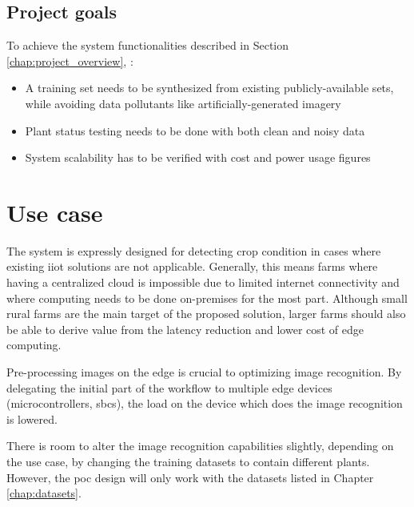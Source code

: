 \documentclass{report}
\begin{document}
	\section{Project goals}
	To achieve the system functionalities described in Section \ref{chap:project_overview}, :
	\begin{itemize}
		\item A training set needs to be synthesized from existing publicly-available sets, while avoiding data pollutants like artificially-generated imagery
		\item Plant status testing needs to be done with both clean and noisy data
		\item System scalability has to be verified with cost and power usage figures 
	\end{itemize}
	
	
	
	\chapter{Use case}
	The system is expressly designed for detecting crop condition in cases where existing \gls{iiot} solutions are not applicable. Generally, this means farms where having a centralized cloud is impossible due to limited internet connectivity and where computing needs to be done on-premises for the most part. Although small rural farms are the main target of the proposed solution, larger farms should also be able to derive value from the latency reduction and lower cost of edge computing.
	
	Pre-processing images on the edge is crucial to optimizing image recognition. By delegating the initial part of the workflow to multiple edge devices (microcontrollers, \glspl{sbc}), the load on the device which does the image recognition is lowered.
	
	There is room to alter the image recognition capabilities slightly, depending on the use case, by changing the training datasets to contain different plants. However, the \gls{poc} design will only work with the datasets listed in Chapter \ref{chap:datasets}.
	
	
\end{document}
